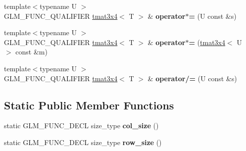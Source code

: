 \begin{DoxyCompactItemize}
\item 
\hypertarget{structglm_1_1detail_1_1tmat3x4_aa0d4113930ab360d4f5575fa73003501}{{\footnotesize template$<$typename U $>$ }\\G\-L\-M\-\_\-\-F\-U\-N\-C\-\_\-\-Q\-U\-A\-L\-I\-F\-I\-E\-R \hyperlink{structglm_1_1detail_1_1tmat3x4}{tmat3x4}$<$ T $>$ \& {\bfseries operator$\ast$=} (U const \&s)}\label{structglm_1_1detail_1_1tmat3x4_aa0d4113930ab360d4f5575fa73003501}

\item 
\hypertarget{structglm_1_1detail_1_1tmat3x4_a7f656b8af39de92a031890d41512f795}{{\footnotesize template$<$typename U $>$ }\\G\-L\-M\-\_\-\-F\-U\-N\-C\-\_\-\-Q\-U\-A\-L\-I\-F\-I\-E\-R \hyperlink{structglm_1_1detail_1_1tmat3x4}{tmat3x4}$<$ T $>$ \& {\bfseries operator$\ast$=} (\hyperlink{structglm_1_1detail_1_1tmat3x4}{tmat3x4}$<$ U $>$ const \&m)}\label{structglm_1_1detail_1_1tmat3x4_a7f656b8af39de92a031890d41512f795}

\item 
\hypertarget{structglm_1_1detail_1_1tmat3x4_af4077f6b0bd7556d9d724341a300ad8a}{{\footnotesize template$<$typename U $>$ }\\G\-L\-M\-\_\-\-F\-U\-N\-C\-\_\-\-Q\-U\-A\-L\-I\-F\-I\-E\-R \hyperlink{structglm_1_1detail_1_1tmat3x4}{tmat3x4}$<$ T $>$ \& {\bfseries operator/=} (U const \&s)}\label{structglm_1_1detail_1_1tmat3x4_af4077f6b0bd7556d9d724341a300ad8a}

\end{DoxyCompactItemize}
\subsection*{Static Public Member Functions}
\begin{DoxyCompactItemize}
\item 
\hypertarget{structglm_1_1detail_1_1tmat3x4_a9c3d97c02718f4e9a45cabe4e2ef1fe9}{static G\-L\-M\-\_\-\-F\-U\-N\-C\-\_\-\-D\-E\-C\-L size\-\_\-type {\bfseries col\-\_\-size} ()}\label{structglm_1_1detail_1_1tmat3x4_a9c3d97c02718f4e9a45cabe4e2ef1fe9}

\item 
\hypertarget{structglm_1_1detail_1_1tmat3x4_a36158f36742dc0754be50ef176491759}{static G\-L\-M\-\_\-\-F\-U\-N\-C\-\_\-\-D\-E\-C\-L size\-\_\-type {\bfseries row\-\_\-size} ()}\label{structglm_1_1detail_1_1tmat3x4_a36158f36742dc0754be50ef176491759}

\end{DoxyCompactItemize}



